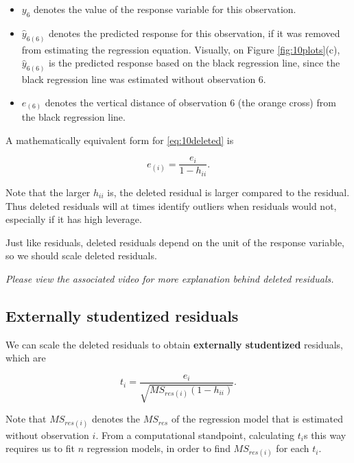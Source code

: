 \documentclass[
]{book}
\providecommand{\tightlist}{%
  \setlength{\itemsep}{0pt}\setlength{\parskip}{0pt}}
\begin{document}
\begin{itemize}
\tightlist
\item
  \(y_6\) denotes the value of the response variable for this observation.
\item
  \(\hat{y}_{6(6)}\) denotes the predicted response for this observation, if it was removed from estimating the regression equation. Visually, on Figure \ref{fig:10plots}(c), \(\hat{y}_{6(6)}\) is the predicted response based on the black regression line, since the black regression line was estimated without observation 6.
\item
  \(e_{(6)}\) denotes the vertical distance of observation 6 (the orange cross) from the black regression line.
\end{itemize}

A mathematically equivalent form for \eqref{eq:10deleted} is

\begin{equation} 
e_{(i)} = \frac{e_i}{1-h_{ii}}.
\label{eq:10deleted2}
\end{equation}

Note that the larger \(h_{ii}\) is, the deleted residual is larger compared to the residual. Thus deleted residuals will at times identify outliers when residuals would not, especially if it has high leverage.

Just like residuals, deleted residuals depend on the unit of the response variable, so we should scale deleted residuals.

\emph{Please view the associated video for more explanation behind deleted residuals.}

\hypertarget{externally-studentized-residuals}{%
\subsection{Externally studentized residuals}\label{externally-studentized-residuals}}

We can scale the deleted residuals to obtain \textbf{externally studentized} residuals, which are

\begin{equation} 
t_i = \frac{e_i}{\sqrt{MS_{res(i)}(1-h_{ii})}}.
\label{eq:10sdeleted}
\end{equation}

Note that \(MS_{res(i)}\) denotes the \(MS_{res}\) of the regression model that is estimated without observation \(i\). From a computational standpoint, calculating \(t_i\)s this way requires us to fit \(n\) regression models, in order to find \(MS_{res(i)}\) for each \(t_i\).
\end{document}
